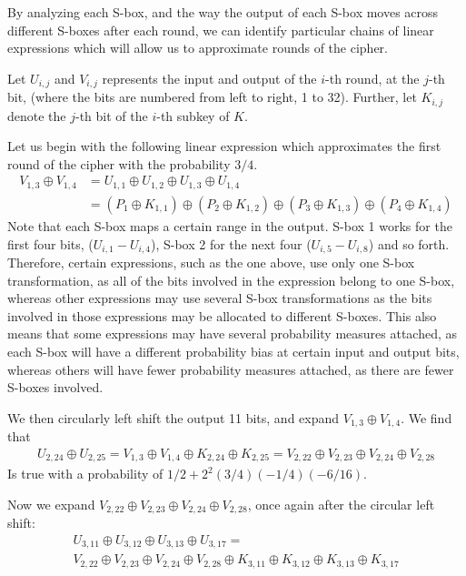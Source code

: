 \documentclass[12pt, a4paper, final]{report}
\begin{document}
By analyzing each S-box, and the way the output of each S-box moves across
different S-boxes after each round, we can identify particular chains of
linear expressions which will allow us to approximate rounds of the cipher.

Let $U_{i,j}$ and $V_{i,j}$ represents the input and output of the $i$-th round,
at the $j$-th bit, (where the bits are numbered from left to right, 1 to 32).
Further, let $K_{i,j}$ denote the $j$-th bit of the $i$-th subkey of $K$.

Let us begin with the following linear expression which approximates the first round of
the cipher with the probability $3/4$.
\begin{align*}
    V_{1,3} \oplus V_{1,4} &= U_{1,1} \oplus U_{1,2} \oplus U_{1,3} \oplus U_{1,4}\\
    &= (P_1 \oplus K_{1,1}) \oplus (P_2 \oplus K_{1,2}) \oplus (P_3 \oplus K_{1,3})
    \oplus (P_4 \oplus K_{1,4})
\end{align*}
Note that each S-box maps a certain range in the output. S-box 1 works for the
first four bits, ($U_{i,1} - U_{i,4}$), S-box 2 for the next four ($U_{i,5} -
U_{i,8}$) and so forth. Therefore, certain expressions, such as the one above,
use only one S-box transformation, as all of the bits involved in the expression
belong to one S-box, whereas other expressions may use several S-box transformations
as the bits involved in those expressions may be allocated to different S-boxes.
This also means that some expressions may have several probability measures
attached, as each S-box will have a different probability bias at certain input
and output bits, whereas others will have fewer probability measures attached, as
there are fewer S-boxes involved.

We then circularly left shift the output 11 bits, and expand $V_{1,3}
\oplus V_{1,4}$. We find that
\begin{align*}
    U_{2,24} \oplus U_{2,25} = V_{1,3} \oplus V_{1,4} \oplus K_{2,24} \oplus K_{2,25}
    = V_{2,22} \oplus V_{2,23} \oplus V_{2,24} \oplus V_{2,28}
\end{align*}
Is true with a probability of $1/2 + 2^2(3/4)(-1/4)(-6/16)$.

Now we expand $V_{2,22} \oplus V_{2,23} \oplus V_{2,24} \oplus V_{2,28}$, once again
after the circular left shift:
\begin{align*}
    U_{3,11} \oplus U_{3,12} \oplus U_{3,13} \oplus U_{3,17} =\\
    V_{2,22} \oplus V_{2,23} \oplus V_{2,24} \oplus V_{2,28} \oplus K_{3,11}
    \oplus K_{3,12} \oplus K_{3,13} \oplus K_{3,17}
\end{align*}
\end{document}
